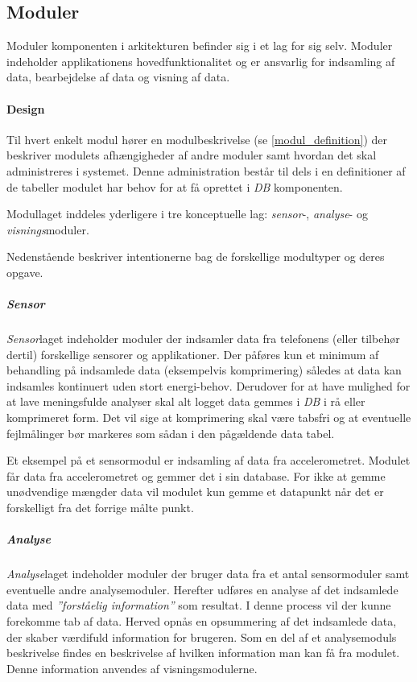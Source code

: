 \subsection*{Moduler}
Moduler komponenten i arkitekturen befinder sig i et lag for sig selv.
Moduler indeholder applikationens hovedfunktionalitet og er ansvarlig for indsamling af data, bearbejdelse af data og visning af data.

\paragraph{Design}
Til hvert enkelt modul hører en modulbeskrivelse (se \cref{modul_definition}) der beskriver modulets afhængigheder af andre moduler samt hvordan det skal administreres i systemet.
Denne administration består til dels i en definitioner af de tabeller modulet har behov for at få oprettet i \textit{DB} komponenten.

Modullaget inddeles yderligere i tre konceptuelle lag: \textit{sensor}-, \textit{analyse}- og \textit{visnings}moduler.

Nedenstående beskriver intentionerne bag de forskellige modultyper og deres opgave.

\subparagraph{Sensor}
\textit{Sensor}laget indeholder moduler der indsamler data fra telefonens (eller tilbehør dertil) forskellige sensorer og applikationer.
Der påføres kun et minimum af behandling på indsamlede data (eksempelvis komprimering) således at data kan indsamles kontinuert uden stort energi-behov.
Derudover for at have mulighed for at lave meningsfulde analyser skal alt logget data gemmes i \textit{DB} i rå eller komprimeret form.
Det vil sige at komprimering skal være tabsfri og at eventuelle fejlmålinger bør markeres som sådan i den pågældende data tabel.

Et eksempel på et sensormodul er indsamling af data fra accelerometret.
Modulet får data fra accelerometret og gemmer det i sin database. 
For ikke at gemme unødvendige mængder data vil modulet kun gemme et datapunkt når det er forskelligt fra det forrige målte punkt.

\subparagraph{Analyse}
\textit{Analyse}laget indeholder moduler der bruger data fra et antal sensormoduler samt eventuelle andre analysemoduler.
Herefter udføres en analyse af det indsamlede data med \textit{''forståelig information''} som resultat.
I denne process vil der kunne forekomme tab af data.
Herved opnås en opsummering af det indsamlede data, der skaber værdifuld information for brugeren.
Som en del af et analysemoduls beskrivelse findes en beskrivelse af hvilken information man kan få fra modulet.
Denne information anvendes af visningsmodulerne.

